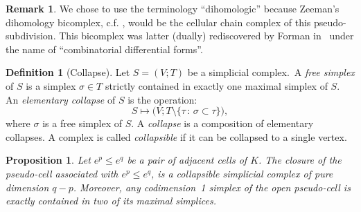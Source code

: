 \documentclass[10pt]{amsart}
\newtheorem{prop}[theo]{Proposition}
\theoremstyle{definition}
\newtheorem{defi}[theo]{Definition}
\newtheorem{rema}[theo]{Remark}
\numberwithin{equation}{section}
\numberwithin{figure}{section}
\begin{document}
\begin{rema}
We chose to use the terminology ``dihomologic'' because Zeeman's dihomology bicomplex, c.f. \cite{Zee_dih_i,Zee_dih_ii,Zee_dih_iii}, would be the cellular chain complex of this pseudo-subdivision. This bicomplex was latter (dually) rediscovered by Forman in~\cite{For_comb_nov} under the name of ``combinatorial differential forms''.
\end{rema}

\begin{defi}[Collapse]
Let $S=(V;T)$ be a simplicial complex.~A \emph{free simplex} of $S$ is a simplex $\sigma\in T$ strictly contained in exactly one maximal simplex of $S$. An \emph{elementary collapse} of $S$ is the operation:
\begin{equation*}
S\mapsto \big(V;T\setminus\{\tau\,:\,\sigma\subset \tau\}\big),
\end{equation*}
where $\sigma$ is a free simplex of $S$. A \emph{collapse} is a composition of elementary collapses. A complex is called \emph{collapsible} if it can be collapsed to a single vertex.
\end{defi}

\begin{prop}
Let $e^p\leq e^q$ be a pair of adjacent cells of $K$. The closure of the pseudo-cell associated with $e^p\leq e^q$, is a collapsible simplicial complex of pure dimension $q-p$. Moreover, any codimension~1 simplex of the open pseudo-cell is exactly contained in two of its maximal simplices.
\end{prop}
\end{document}
